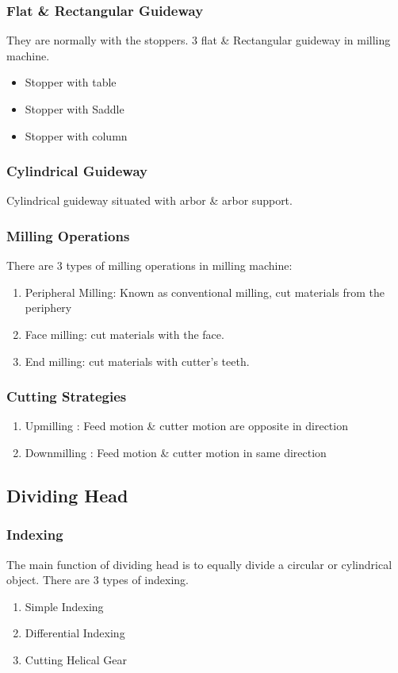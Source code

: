 \documentclass{article}
\begin{document}
\begin{multicols}{2}
\subsubsection*{Flat \& Rectangular Guideway}
They are normally with the stoppers. 3 flat \& Rectangular guideway in milling machine. 
\begin{itemize}
  \item Stopper with table 
  \item Stopper with Saddle 
  \item Stopper with column 
\end{itemize}

\subsubsection*{Cylindrical Guideway}
Cylindrical guideway situated with arbor \& arbor support. 

\subsubsection*{Milling Operations}
There are 3 types of milling operations in milling machine: 
\begin{enumerate}
  \item Peripheral Milling: Known as conventional milling, cut materials from the periphery
  \item Face milling: cut materials with the face. 
  \item End milling: cut materials with cutter's teeth. 
\end{enumerate}

\subsubsection*{Cutting Strategies}
\begin{enumerate} 
  \item Upmilling : Feed motion \& cutter motion are opposite in direction 
  \item Downmilling : Feed motion \& cutter motion in same direction 
\end{enumerate}

\subsection*{Dividing Head}
\subsubsection*{Indexing}
The main function of dividing head is to equally divide a circular or cylindrical object. There are 3 types of indexing.
\begin{enumerate}
  \item Simple Indexing 
  \item Differential Indexing 
  \item Cutting Helical Gear 
\end{enumerate}


\end{multicols}
\end{document}
